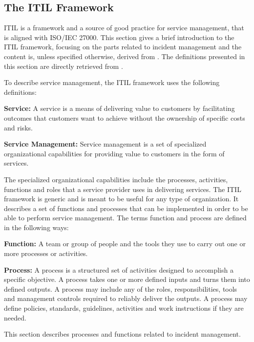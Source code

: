 \subsection{The ITIL Framework}
\label{section:ITIL}
\ac{ITIL} is a framework and a source of good practice for service management, that is aligned with \acs{ISO}/\acs{IEC} 27000. This section gives a brief introduction to the \ac{ITIL} framework, focusing on the parts related to incident management and the content is, unless specified otherwise, derived from \cite{itilbok}. The definitions presented in this section are directly retrieved from \cite{itilbok}.

To describe service management, the \ac{ITIL} framework uses the following definitions:

\textbf{Service:} A service is a means of delivering value to customers by facilitating outcomes that customers want to achieve without the ownership of specific costs and risks.

\textbf{Service Management:} Service management is a set of specialized organizational capabilities for providing value to customers in the form of services.

The specialized organizational capabilities include the processes, activities, functions and roles that a service provider uses in delivering services. The \ac{ITIL} framework is generic and is meant to be useful for any type of organization. It describes a set of functions and processes that can be implemented in order to be able to perform service management. The terms function and process are defined in the following ways:

\textbf{Function:} A team or group of people and the tools they use to carry out one or more processes or activities.

\textbf{Process:} A process is a structured set of activities designed to accomplish a specific objective. A process takes one or more defined inputs and turns them into defined outputs. A process may include any of the roles, responsibilities, tools and management controls required to reliably deliver the outputs. A process may define policies, standards, guidelines, activities and work instructions if they are needed.


This section describes processes and functions related to incident management.

